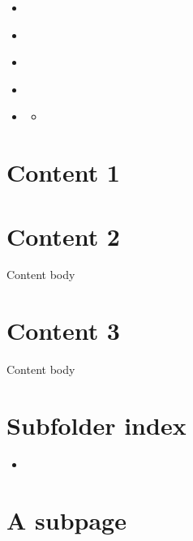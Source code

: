 

\pagestyle{empty}
\sphinxmaketitle
\pagestyle{plain}
\sphinxtableofcontents
\pagestyle{normal}
\label{\detokenize{index::doc}}


\begin{itemize}
\item{}{\hyperref[\detokenize{content1::doc}]{}}

\item{}{\hyperref[\detokenize{content2::doc}]{}}

\item{}{\hyperref[\detokenize{content3::doc}]{}}

\item{} 

\item{}{\hyperref[\detokenize{subfolder/index::doc}]{}}

\begin{itemize}
\item{}{\hyperref[\detokenize{subfolder/asubpage::doc}]{}}

\end{itemize}
\end{itemize}


\chapter{Content 1}
\label{\detokenize{content1:content-1}}\label{\detokenize{content1::doc}}

\chapter{Content 2}
\label{\detokenize{content2:content-2}}\label{\detokenize{content2::doc}}
Content body


\chapter{Content 3}
\label{\detokenize{content3:content-3}}\label{\detokenize{content3::doc}}
Content body


\chapter{Subfolder index}
\label{\detokenize{subfolder/index:subfolder-index}}\label{\detokenize{subfolder/index::doc}}
\begin{itemize}
\item{}{\hyperref[\detokenize{subfolder/asubpage::doc}]{}}

\end{itemize}


\chapter{A subpage}
\label{\detokenize{subfolder/asubpage:a-subpage}}\label{\detokenize{subfolder/asubpage::doc}}






\renewcommand{\indexname}{Index}
\printindex

